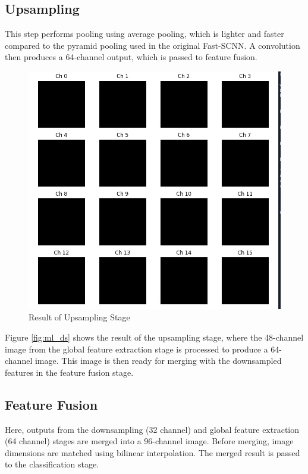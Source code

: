 \subsection{Upsampling}
This step performs pooling using average pooling, which is lighter and faster compared to the pyramid pooling used in the original Fast-SCNN. A convolution then produces a 64-channel output, which is passed to feature fusion.
\begin{figure}[H]
	\centering
	\includegraphics[width=\linewidth]{../konten/gf_1.png}
	\caption{Result of Upsampling Stage}
	\label{fig:ml_gf1}
\end{figure} 
Figure \ref{fig:ml_ds} shows the result of the upsampling stage, where the 48-channel image from the global feature extraction stage is processed to produce a 64-channel image. This image is then ready for merging with the downsampled features in the feature fusion stage.

\subsection{Feature Fusion}
Here, outputs from the downsampling (32 channel) and global feature extraction (64 channel) stages are merged into a 96-channel image. Before merging, image dimensions are matched using bilinear interpolation. The merged result is passed to the classification stage.


